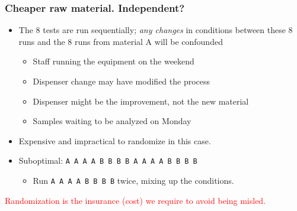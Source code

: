 \begin{frame}\frametitle{Cheaper raw material. Independent?}
	\begin{itemize}
		\item The 8 tests are run sequentially; \emph{any changes} in conditions between these 8 runs and the 8 runs from material A will be confounded
		\begin{itemize}
			\item Staff running the equipment on the weekend
			\item Dispenser change may have modified the process
			\item Dispenser might be the improvement, not the new material
			\item Samples waiting to be analyzed on Monday \pause
		\end{itemize}
	\end{itemize}
	\begin{itemize}
		\item Expensive and impractical to randomize in this case.
		\item Suboptimal: \texttt{A A A A B B B B A A A A B B B B}
		\begin{itemize}
			\item Run \texttt{A A A A B B B B} twice, mixing up the conditions.\pause
		\end{itemize}
	\end{itemize}

	\textcolor{red}{Randomization is the insurance (cost) we require to avoid being misled.}
\end{frame}

